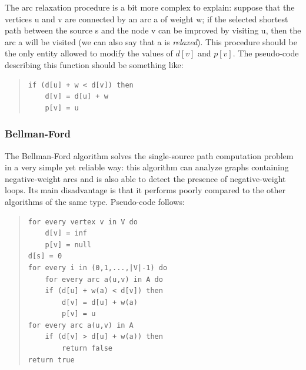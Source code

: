 \documentclass[10pt,a4paper]{report}
\begin{document}
\begin{itemize}
  The arc relaxation procedure is a bit more complex to explain:
  suppose that the vertices u and v are connected by an arc a of
  weight w; if the selected shortest path between the source s and the
  node v can be improved by visiting u, then the arc a will be visited
  (we can also say that a is \textit{relaxed}). This procedure should
  be the only entity allowed to modify the values of \(d[v]\) and
  \(p[v]\). The pseudo-code describing this function should be
  something like:
  \begin{quote}
    \begin{lstlisting}
if (d[u] + w < d[v]) then
    d[v] = d[u] + w
    p[v] = u
    \end{lstlisting}
  \end{quote}
\end{itemize}

\subsubsection{Bellman-Ford}

The Bellman-Ford algorithm solves the single-source path computation
problem in a very simple yet reliable way: this algorithm can analyze
graphs containing negative-weight arcs and is also able to detect the
presence of negative-weight loops. Its main disadvantage is that it
performs poorly compared to the other algorithms of the same
type. Pseudo-code follows:
\begin{quote}
\begin{lstlisting}
for every vertex v in V do
    d[v] = inf
    p[v] = null
d[s] = 0
for every i in (0,1,...,|V|-1) do
    for every arc a(u,v) in A do
    if (d[u] + w(a) < d[v]) then
        d[v] = d[u] + w(a)
        p[v] = u
for every arc a(u,v) in A
    if (d[v] > d[u] + w(a)) then
        return false
return true
\end{lstlisting}
\end{quote}
\end{document}
